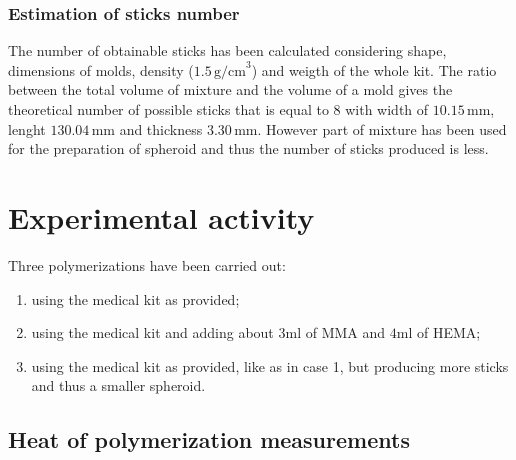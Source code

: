 \documentclass[a4paper, 11pt]{article}
\begin{document}
\subsubsection{Estimation of sticks number}

The number of obtainable sticks has been calculated considering shape, dimensions 
of molds, density ($1.5\,\text{g/cm}^3$) and weigth of the whole kit.
The ratio between the total volume of mixture and the volume of a mold gives the theoretical number of possible sticks that is equal to 8 with width of $10.15\,\text{mm}$, lenght $130.04\,\text{mm}$ and thickness $3.30\,\text{mm}$.
However part of mixture has been used for the preparation of spheroid and thus the number of sticks produced is less.

\section{Experimental activity}

Three polymerizations have been carried out: 
\begin{enumerate}
\item using the medical kit as provided;
\item using the medical kit and adding about $3 \text{ml}$ of MMA and $4 \text{ml}$ of HEMA;
\item using the medical kit as provided, like as in case 1, but producing more sticks and thus a smaller spheroid.
\end{enumerate}

\subsection{Heat of polymerization measurements}
\end{document}
